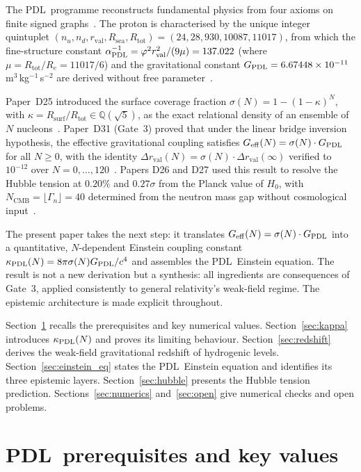 \documentclass[11pt,a4paper]{article}
\theoremstyle{definition}
\newcommand{\PDL}{\textnormal{PDL}}
\newcommand{\Rsurf}{R_{\mathrm{surf}}}
\newcommand{\Rsea}{R_{\mathrm{sea}}}
\newcommand{\Rtot}{R_{\mathrm{tot}}}
\newcommand{\rval}{r_{\mathrm{val}}}
\newcommand{\Ree}{R_e}
\newcommand{\vp}{\varphi}
\newcommand{\aPDL}{\alpha_{\PDL}}
\newcommand{\GPDL}{G_{\PDL}}
\newcommand{\Geff}{G_{\mathrm{eff}}}
\newcommand{\sig}{\sigma}
\newcommand{\kap}{\kappa}
\newcommand{\kPDL}{\kappa_{\PDL}}
\begin{document}
The \PDL\ programme reconstructs fundamental physics from four axioms on finite signed graphs~\cite{PDL_Main_2026,PDL_Intro_2026}. The proton is characterised by the unique integer quintuplet $(n_u, n_d, \rval, \Rsea, \Rtot) = (24, 28, 930, 10087, 11017)$, from which the fine-structure constant $\aPDL^{-1} = \vp^2\rval^2/(9\mu) = 137.022$ (where $\mu = \Rtot/\Ree = 11017/6$) and the gravitational constant $\GPDL = 6.67448\times10^{-11}$\,m$^3$\,kg$^{-1}$\,s$^{-2}$ are derived without free parameter~\cite{Combinatorial_Proton_v2_2026,Bridge_PDL_2026}.

Paper~D25 introduced the surface coverage fraction $\sig(N) = 1-(1-\kap)^N$, with $\kap = \Rsurf/\Rtot \in \mathbb{Q}(\sqrt{5})$, as the exact relational density of an ensemble of $N$ nucleons~\cite{Effective_Sigma_PDL_2026}. Paper~D31 (Gate~3) proved that under the linear bridge inversion hypothesis, the effective gravitational coupling satisfies $\Geff(N) = \sig(N)\cdot\GPDL$ for all $N \geq 0$, with the identity $\Delta r_{\mathrm{val}}(N) = \sig(N)\cdot\Delta r_{\mathrm{val}}(\infty)$ verified to $10^{-12}$ over $N = 0,\ldots,120$~\cite{PDL_D31_2026}. Papers D26 and D27 used this result to resolve the Hubble tension at $0.20\%$ and $0.27\sigma$ from the Planck value of $H_0$, with $N_{\mathrm{CMB}} = \lfloor\Gamma_n\rfloor = 40$ determined from the neutron mass gap without cosmological input~\cite{Hubble_Resolution_PDL_2026,N_CMB_PDL_2026}.

The present paper takes the next step: it translates $\Geff(N) = \sig(N)\cdot\GPDL$ into a quantitative, $N$-dependent Einstein coupling constant $\kPDL(N) = 8\pi\sig(N)\GPDL/c^4$ and assembles the \PDL\ Einstein equation. The result is not a new derivation but a synthesis: all ingredients are consequences of Gate~3, applied consistently to general relativity's weak-field regime. The epistemic architecture is made explicit throughout.

Section~\ref{sec:prereq} recalls the prerequisites and key numerical values. Section~\ref{sec:kappa} introduces $\kPDL(N)$ and proves its limiting behaviour. Section~\ref{sec:redshift} derives the weak-field gravitational redshift of hydrogenic levels. Section~\ref{sec:einstein_eq} states the \PDL\ Einstein equation and identifies its three epistemic layers. Section~\ref{sec:hubble} presents the Hubble tension prediction. Sections~\ref{sec:numerics} and~\ref{sec:open} give numerical checks and open problems.

\section{\PDL\ prerequisites and key values}
\label{sec:prereq}
\end{document}
